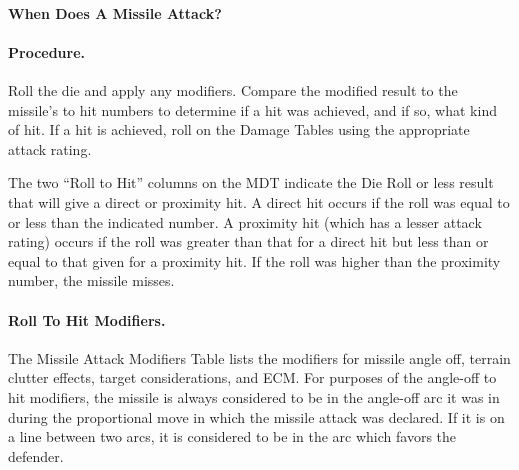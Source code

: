 \paragraph{When Does A Missile Attack?}  


\paragraph{Procedure.} Roll the die and apply any modifiers. Compare the modified result to the missile's to hit numbers to determine if a hit was achieved, and if so, what kind of hit. If a hit is achieved, roll on the Damage Tables using the appropriate attack rating.

The two “Roll to Hit” columns on the MDT indicate the Die Roll or less result that will give a direct or proximity hit. A direct hit occurs if the roll was equal to or less than the indicated number. A proximity hit (which has a lesser attack rating) occurs if the roll was greater than that for a direct hit but less than or equal to that given for a proximity hit. If the roll was higher than the proximity number, the missile misses.

\paragraph{Roll To Hit Modifiers.} The Missile Attack Modifiers Table lists the modifiers for missile angle off, terrain clutter effects, target considerations, and ECM. For purposes of the angle-off to hit modifiers, the missile is always considered to be in the angle-off arc it was in during the proportional move in which the missile attack was declared. If it is on a line between two arcs, it is considered to be in the arc which favors the defender.

